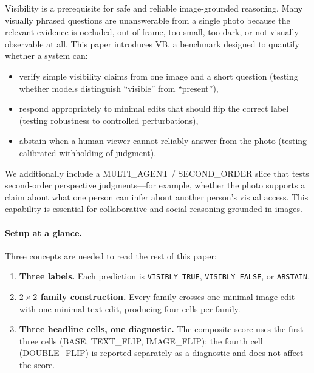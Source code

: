 \documentclass[11pt]{article}
\newcommand{\benchmarkname}{\textsc{VB}}
\begin{document}
Visibility is a prerequisite for safe and reliable image-grounded reasoning. Many visually phrased questions are unanswerable from a single photo because the relevant evidence is occluded, out of frame, too small, too dark, or not visually observable at all. This paper introduces \benchmarkname, a benchmark designed to quantify whether a system can:
\begin{itemize}[noitemsep, topsep=3pt]
  \item verify simple visibility claims from one image and a short question (testing whether models distinguish ``visible'' from ``present''),
  \item respond appropriately to minimal edits that should flip the correct label (testing robustness to controlled perturbations),
  \item abstain when a human viewer cannot reliably answer from the photo (testing calibrated withholding of judgment).
\end{itemize}

We additionally include a MULTI\_AGENT / SECOND\_ORDER slice that tests second-order perspective judgments---for example, whether the photo supports a claim about what one person can infer about another person's visual access. This capability is essential for collaborative and social reasoning grounded in images.

\paragraph{Setup at a glance.}
Three concepts are needed to read the rest of this paper:
\begin{enumerate}[noitemsep, topsep=3pt]
  \item \textbf{Three labels.} Each prediction is \texttt{VISIBLY\_TRUE}, \texttt{VISIBLY\_FALSE}, or \texttt{ABSTAIN}.
  \item \textbf{\(2\times 2\) family construction.} Every family crosses one minimal image edit with one minimal text edit, producing four cells per family.
  \item \textbf{Three headline cells, one diagnostic.} The composite score uses the first three cells (BASE, TEXT\_FLIP, IMAGE\_FLIP); the fourth cell (DOUBLE\_FLIP) is reported separately as a diagnostic and does not affect the score.
\end{enumerate}
\end{document}
